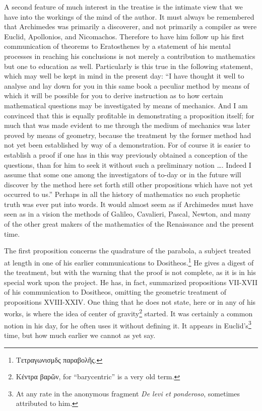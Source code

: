 \documentclass[oneside,12pt]{book}
\begin{document}
A second feature of much interest in the treatise is the intimate view that we have into the workings of the mind of the author. It must always be remembered that Archimedes was primarily a discoverer, and not primarily a compiler as were Euclid, Apollonios, and Nicomachos. Therefore to have him follow up his first communication of theorems to Eratosthenes by a statement of his mental processes in reaching his conclusions is not merely a contribution to mathematics but one to education as well. Particularly is this true in the following statement, which may well be kept in mind in the present day: ``I have thought it well to analyse and lay down for you in this same book a peculiar method by means of which it will be possible for you to derive instruction as to how certain mathematical questions may be investigated by means of mechanics. And I am convinced that this is equally profitable in demonstrating a proposition itself; for much that was made evident to me through the medium of mechanics was later proved by means of geometry, because the treatment by the former method had not yet been established by way of a demonstration. For of course it is easier to establish a proof if one has in this way previously obtained a conception of the questions, than for him to seek it without such a preliminary notion \dots. Indeed I assume that some one among the investigators of to-day or in the future will discover by the method here set forth still other propositions which have not yet occurred to us.'' Perhaps in all the history of mathematics no such prophetic truth was ever put into words. It would almost seem as if Archimedes must have seen as in a vision the methods of Galileo, Cavalieri, Pascal, Newton, and many of the other great makers of the mathematics of the Renaissance and the present time. \par 

The first proposition concerns the quadrature of the parabola, a subject treated at length in one of his earlier communications to Dositheos.\footnote{Τετραγωνισμδς παραβολῆς.} He gives a digest of the treatment, but with the warning that the proof is not complete, as it is in his special work upon the project. He has, in fact, summarized propositions VII-XVII of his communication to Dositheos, omitting the geometric treatment of propositions XVIII-XXIV. One thing that he does not state, here or in any of his works, is where the idea of center of gravity\footnote{{Κέντρα βαρῶν,} for ``barycentric'' is a very old term.} started. It was certainly a common notion in his day, for he often uses it without defining it. It appears in Euclid's\footnote{At any rate in the anonymous fragment \textit{De levi et ponderoso}, sometimes attributed to him.} time, but how much earlier we cannot as yet say. \par 
\end{document}

